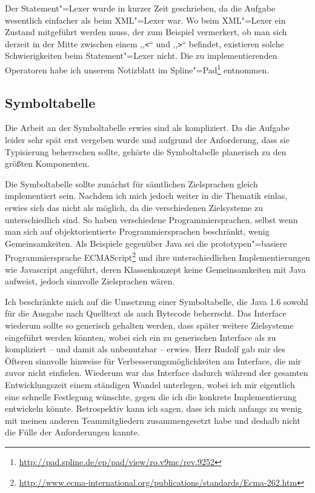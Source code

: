 \documentclass[10pt,a4paper,ngerman,titlepage,tocindentauto]{scrartcl}
\newcommand{\link}[1]{\href{#1}{#1}}
\newcommand{\fnlink}[1]{\footnote{\link{#1}}}
\begin{document}
			Der Statement"=Lexer wurde in kurzer Zeit geschrieben, da die Aufgabe wesentlich einfacher als beim
			XML"=Lexer war. Wo beim XML"=Lexer ein Zustand mitgeführt werden muss, der zum Beispiel vermerkert, ob
			man sich derzeit in der Mitte zwischen einem ,,\verb|<|`` und ,,\verb|>|`` befindet, existieren solche Schwierigkeiten
			beim Statement"=Lexer nicht. Die zu implementierenden Operatoren habe ich unserem Notizblatt im
			Spline"=Pad\fnlink{http://pad.spline.de/ep/pad/view/ro.v9mc/rev.9252} entnommen.
		
		\subsection{Symboltabelle}
			Die Arbeit an der Symboltabelle erwies sind als kompliziert. Da die Aufgabe leider sehr spät erst
			vergeben wurde und aufgrund der Anforderung, dass sie Typisierung beherrschen sollte, gehörte
			die Symboltabelle planerisch zu den größten Komponenten.
			
			Die Symboltabelle sollte zunächst für sämtlichen Zielsprachen gleich implementiert sein. Nachdem
			ich mich jedoch weiter in die Thematik einlas, erwies sich das nicht als möglich, da die verschiedenen
			Zielsysteme zu unterschiedlich sind. So haben verschiedene Programmiersprachen, selbst wenn man
			sich auf objektorientierte Programmiersprachen beschränkt, wenig Gemeinsamkeiten. Als Beispiele gegenüber
			Java sei die prototypen"=basiere
			Programmiersprache ECMAScript\fnlink{http://www.ecma-international.org/publications/standards/Ecma-262.htm}
			und ihre unterschiedlichen Implementierungen wie Javascript
			angeführt, deren Klassenkonzept keine Gemeinsamkeiten mit Java aufweist, jedoch sinnvolle Zielsprachen
			wären.
			
			Ich beschränkte mich auf die Umsetzung einer Symboltabelle, die Java 1.6 sowohl für die Ausgabe
			nach Quelltext als auch Bytecode beherrscht. Das Interface wiederum sollte so generisch gehalten werden,
			dass später weitere Zielsysteme eingeführt werden könnten, wobei sich ein zu generischen Interface
			als zu kompliziert -- und damit als unbenutzbar -- erwies. Herr Rudolf gab mir des Öfteren sinnvolle hinweise
			für Verbesserungsmöglichkeiten am Interface, die mir zuvor nicht einfielen. Wiederum war das Interface
			dadurch während der gesamten Entwicklungszeit einem ständigen Wandel unterlegen, wobei ich mir eigentlich
			eine schnelle Festlegung wünschte, gegen die ich die konkrete Implementierung entwickeln könnte.
			Retrospektiv kann ich sagen, dass ich mich anfangs zu wenig mit meinen anderen Teammitgliedern
			zusammengesetzt habe und deshalb nicht die Fülle der Anforderungen kannte.
			
\end{document}
